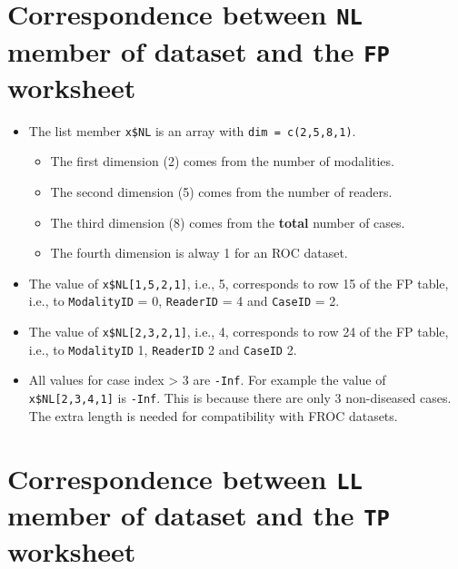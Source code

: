 \documentclass[]{book}
\providecommand{\tightlist}{%
  \setlength{\itemsep}{0pt}\setlength{\parskip}{0pt}}
\begin{document}
\hypertarget{correspondence-between-nl-member-of-dataset-and-the-fp-worksheet}{%
\section{\texorpdfstring{Correspondence between \texttt{NL} member of dataset and the \texttt{FP} worksheet}{Correspondence between NL member of dataset and the FP worksheet}}\label{correspondence-between-nl-member-of-dataset-and-the-fp-worksheet}}

\begin{itemize}
\tightlist
\item
  The list member \texttt{x\$NL} is an array with \texttt{dim\ =\ c(2,5,8,1)}.

  \begin{itemize}
  \tightlist
  \item
    The first dimension (2) comes from the number of modalities.
  \item
    The second dimension (5) comes from the number of readers.
  \item
    The third dimension (8) comes from the \textbf{total} number of cases.
  \item
    The fourth dimension is alway 1 for an ROC dataset.
  \end{itemize}
\item
  The value of \texttt{x\$NL{[}1,5,2,1{]}}, i.e., 5, corresponds to row 15 of the FP table, i.e., to \texttt{ModalityID} = 0, \texttt{ReaderID} = 4 and \texttt{CaseID} = 2.
\item
  The value of \texttt{x\$NL{[}2,3,2,1{]}}, i.e., 4, corresponds to row 24 of the FP table, i.e., to \texttt{ModalityID} 1, \texttt{ReaderID} 2 and \texttt{CaseID} 2.
\item
  All values for case index \textgreater{} 3 are \texttt{-Inf}. For example the value of \texttt{x\$NL{[}2,3,4,1{]}} is \texttt{-Inf}. This is because there are only 3 non-diseased cases. The extra length is needed for compatibility with FROC datasets.
\end{itemize}

\hypertarget{correspondence-between-ll-member-of-dataset-and-the-tp-worksheet}{%
\section{\texorpdfstring{Correspondence between \texttt{LL} member of dataset and the \texttt{TP} worksheet}{Correspondence between LL member of dataset and the TP worksheet}}\label{correspondence-between-ll-member-of-dataset-and-the-tp-worksheet}}
\end{document}
